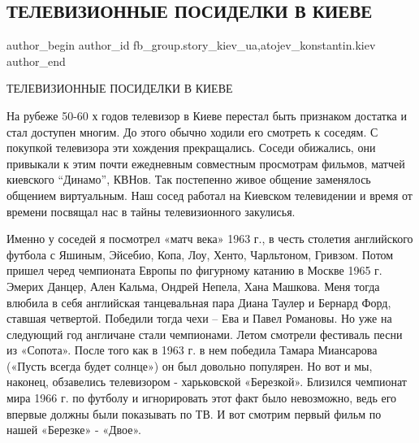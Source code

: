  
 
 
 
 
 
\subsection{ТЕЛЕВИЗИОННЫЕ ПОСИДЕЛКИ В КИЕВЕ}
\label{sec:08_01_2022.fb.fb_group.story_kiev_ua.1.televizor_posidelki_kiev}
 
\ifcmt
 author_begin
   author_id fb_group.story_kiev_ua,atojev_konstantin.kiev
 author_end
\fi

ТЕЛЕВИЗИОННЫЕ ПОСИДЕЛКИ В КИЕВЕ

На рубеже 50-60 х годов телевизор в Киеве перестал быть признаком достатка и
стал доступен многим. До этого обычно ходили его смотреть к соседям. С покупкой
телевизора эти хождения прекращались. Соседи обижались, они привыкали к этим
почти ежедневным совместным просмотрам фильмов, матчей киевского
\enquote{Динамо}, КВНов. Так постепенно живое общение заменялось общением
виртуальным. Наш сосед работал на Киевском телевидении и время от времени
посвящал нас в тайны телевизионного закулисья. 

Именно у соседей я посмотрел «матч века» 1963 г., в честь столетия английского
футбола с Яшиным, Эйсебио, Копа, Лоу, Хенто, Чарльтоном, Гривзом. Потом пришел
черед чемпионата Европы по фигурному катанию в Москве 1965 г. Эмерих Данцер,
Ален Кальма, Ондрей Непела, Хана Машкова. Меня тогда влюбила в себя английская
танцевальная пара Диана Таулер и Бернард Форд, ставшая четвертой. Победили
тогда чехи – Ева и Павел Романовы. Но уже на следующий год англичане стали
чемпионами. Летом смотрели фестиваль песни из «Сопота». После того как в 1963
г. в нем победила Тамара Миансарова («Пусть всегда будет солнце») он был
довольно популярен. Но вот и мы, наконец, обзавелись телевизором - харьковской
«Березкой». Близился чемпионат мира 1966 г. по футболу и игнорировать этот факт
было невозможно, ведь его впервые должны были показывать по ТВ. И вот смотрим
первый фильм по нашей «Березке» - «Двое». 

